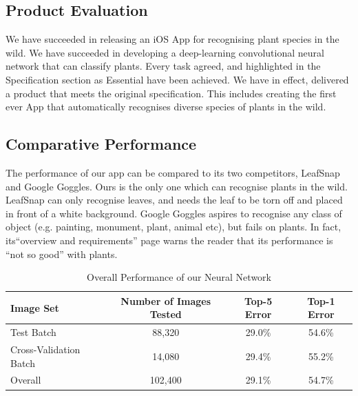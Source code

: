 \documentclass[a4paper,11pt]{article}
\begin{document}
\begin{description}
\subsection{Product Evaluation}


We have succeeded in releasing an iOS App for recognising plant species in the wild. We have succeeded in developing a deep-learning convolutional neural network that can classify plants. Every task agreed, and highlighted in the Specification section as Essential have been achieved. We have in effect, delivered a product that meets the original specification. This includes creating the first ever App that automatically recognises diverse species of plants in the wild.

\subsection{Comparative Performance}

The performance of our app can be compared to its two competitors, LeafSnap and Google Goggles. Ours is the only one which can recognise plants in the wild. LeafSnap can only recognise leaves, and needs the leaf to be torn off and placed in front of a white background. Google Goggles aspires to recognise any class of object (e.g. painting, monument, plant, animal etc), but fails on plants. In fact, its``overview and requirements'' page warns the reader that its performance is ``not so good'' with plants.\\

\begin{table}[h]
   \centering
    \begin{tabular}{|l|ccc|}
    \hline
    Image Set & Number of Images Tested & Top-5 Error & Top-1 Error \\ 
   \hline
    Test Batch & 88,320 & 29.0\% & 54.6\%      \\
    Cross-Validation Batch  & 14,080 & 29.4\% & 55.2\%      \\
    \hline
    Overall & 102,400 & 29.1\% & 54.7\%      \\     
    \hline
    \end{tabular}
    \caption {Overall Performance of our Neural Network}
\end{table}


\end{description}
\end{document}
